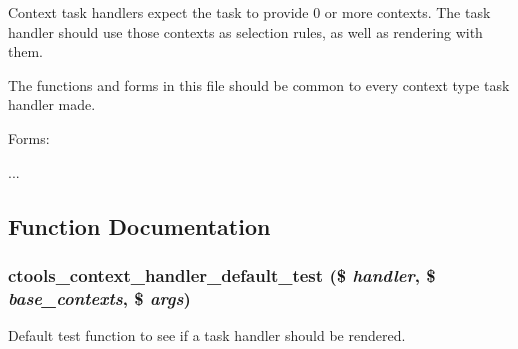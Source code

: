 Context task handlers expect the task to provide 0 or more contexts. The task handler should use those contexts as selection rules, as well as rendering with them.

The functions and forms in this file should be common to every context type task handler made.

Forms:
\begin{DoxyItemize}
\item ... 
\end{DoxyItemize}

\subsection{Function Documentation}
\hypertarget{context-task-handler_8inc_a4cc12d46b27a1b4329443095581da43a}{
\subsubsection[{ctools\_\-context\_\-handler\_\-default\_\-test}]{\setlength{\rightskip}{0pt plus 5cm}ctools\_\-context\_\-handler\_\-default\_\-test (\$ {\em handler}, \/  \$ {\em base\_\-contexts}, \/  \$ {\em args})}}
\label{context-task-handler_8inc_a4cc12d46b27a1b4329443095581da43a}
Default test function to see if a task handler should be rendered.

